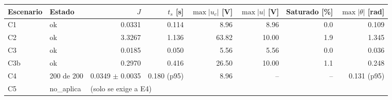 \begin{center}\small\setlength{\tabcolsep}{3.5pt}
\begin{tabular}{@{}l l r r r r r r@{}}
\toprule
Escenario & Estado & $J$ & $t_s$ [s] & $\max|u_c|$ [V] & $\max|u|$ [V] & Saturado [\%] & $\max|\theta|$ [rad] \\
\midrule
C1 & ok & 0.0331 & 0.114 & 8.96 & 8.96 & 0.0 & 0.109 \\
C2 & ok & 3.3267 & 1.136 & 63.82 & 10.00 & 1.9 & 1.345 \\
C3 & ok & 0.0185 & 0.050 & 5.56 & 5.56 & 0.0 & 0.036 \\
C3b & ok & 0.2970 & 0.416 & 26.50 & 10.00 & 1.1 & 0.248 \\
\midrule
C4 & 200 de 200 & 0.0349 $\pm$ 0.0035 & 0.180 (p95) & 8.96 & -- & -- & 0.131 (p95) \\
C5 & no\_aplica & \multicolumn{6}{l}{(solo se exige a E4)} \\
\bottomrule
\end{tabular}
\end{center}
